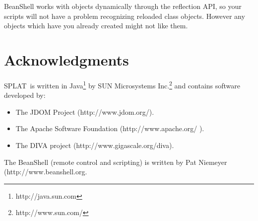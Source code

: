 \documentclass[twoside,11pt]{article}
\newcommand{\htmladdnormallinkfoot}[2]{#1\footnote{#2}}
\newcommand{\htmladdnormallink}[2]{#1}
\renewcommand{\_}{\texttt{\symbol{95}}}
\newcommand{\SPLAT}{\textsf{SPLAT}}
\begin{document}
BeanShell works with objects dynamically through the reflection API,
so your scripts will not have a problem recognizing reloaded class
objects.  However any objects which have you already created might not
like them.

\section{Acknowledgments}

\SPLAT\ is written in
\htmladdnormallinkfoot{Java}{http://java.sun.com} by
\htmladdnormallinkfoot{SUN Microsystems Inc.}{http://www.sun.com/} and
contains software developed by:
\begin{itemize}
\item The JDOM Project (\htmladdnormallink{http://www.jdom.org/}
                        {http://www.jdom.org/}).
\item The Apache Software Foundation
      (\htmladdnormallink{http://www.apache.org/}{http://www.apache.org/} ).
\item The DIVA project
      (\htmladdnormallink{http://www.gigascale.org/diva}
                         {http://www.gigascale.org/diva}).  
\end{itemize}

The BeanShell (remote control and scripting) is written by Pat
Niemeyer (\htmladdnormallink{http://www.beanshell.org}).
\end{document}
